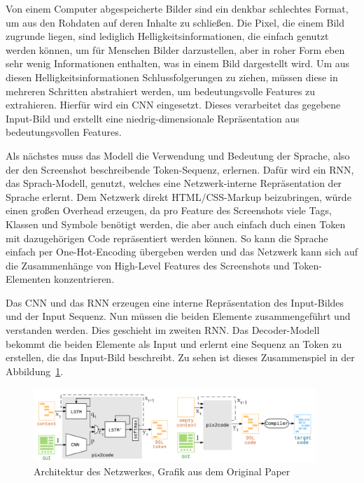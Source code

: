 \documentclass[pdftex,a4paper,halfparskip, article]{scrartcl}
\begin{document}
Von einem Computer abgespeicherte Bilder sind ein denkbar schlechtes Format, um aus den Rohdaten auf deren Inhalte zu schließen. Die Pixel, die einem Bild zugrunde liegen, sind lediglich Helligkeitsinformationen, die einfach genutzt werden können, um für Menschen Bilder darzustellen, aber in roher Form eben sehr wenig Informationen enthalten, was in einem Bild dargestellt wird. Um aus diesen Helligkeitsinformationen Schlussfolgerungen zu ziehen, müssen diese in mehreren Schritten abstrahiert werden, um bedeutungsvolle Features zu extrahieren. Hierfür wird ein CNN eingesetzt. Dieses verarbeitet das gegebene Input-Bild und erstellt eine niedrig-dimensionale Repräsentation aus bedeutungsvollen Features. 

Als nächstes muss das Modell die Verwendung und Bedeutung der Sprache, also der den Screenshot beschreibende Token-Sequenz, erlernen. Dafür wird ein RNN, das Sprach-Modell, genutzt, welches eine Netzwerk-interne Repräsentation der Sprache erlernt. Dem Netzwerk direkt  HTML/CSS-Markup beizubringen, würde einen großen Overhead erzeugen, da pro Feature des Screenshots viele Tags, Klassen und Symbole benötigt werden, die aber auch einfach duch einen Token mit dazugehörigen Code repräsentiert werden können. So kann die Sprache einfach per One-Hot-Encoding übergeben werden und das Netzwerk kann sich auf die Zusammenhänge von High-Level Features des Screenshots und Token-Elementen konzentrieren.

Das CNN und das RNN  erzeugen eine interne Repräsentation des Input-Bildes und der Input Sequenz. Nun müssen die beiden Elemente zusammengeführt und verstanden werden. Dies geschieht im zweiten RNN. Das Decoder-Modell bekommt die beiden Elemente als Input und erlernt eine Sequenz an Token zu erstellen, die das Input-Bild beschreibt. Zu sehen ist dieses Zusammenspiel in der Abbildung~\ref{fig:pix2code_paper_architecture}.

\begin{figure}[h]
\centering
\includegraphics[width=0.95\textwidth]{pix2code_paper_architecture}
\caption{Architektur des Netzwerkes, Grafik aus dem Original Paper \cite{Beltramelli17}}
\label{fig:pix2code_paper_architecture}
\end{figure}
\end{document}
